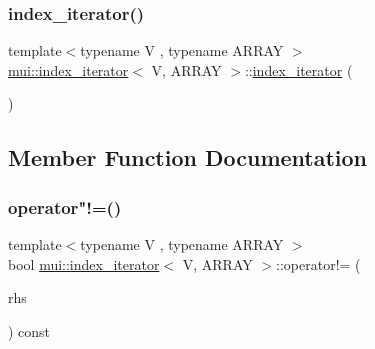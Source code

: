\mbox{\label{structmui_1_1index__iterator_ac51630f186471fbc8c55320e58b34439}} 
\subsubsection{\texorpdfstring{index\+\_\+iterator()}{index\_iterator()}\hspace{0.1cm}{\footnotesize\ttfamily [3/3]}}
{\footnotesize\ttfamily template$<$typename V , typename A\+R\+R\+AY $>$ \\
\hyperlink{structmui_1_1index__iterator}{mui\+::index\+\_\+iterator}$<$ V, A\+R\+R\+AY $>$\+::\hyperlink{structmui_1_1index__iterator}{index\+\_\+iterator} (\begin{DoxyParamCaption}\item[{const \hyperlink{structmui_1_1index__iterator}{index\+\_\+iterator}$<$ V, A\+R\+R\+AY $>$ \&}]{ }\end{DoxyParamCaption})\hspace{0.3cm}{\ttfamily [default]}}



\subsection{Member Function Documentation}
\mbox{\label{structmui_1_1index__iterator_a4d779fea0337c8d40e368c93e2c137a6}} 
\subsubsection{\texorpdfstring{operator"!=()}{operator!=()}}
{\footnotesize\ttfamily template$<$typename V , typename A\+R\+R\+AY $>$ \\
bool \hyperlink{structmui_1_1index__iterator}{mui\+::index\+\_\+iterator}$<$ V, A\+R\+R\+AY $>$\+::operator!= (\begin{DoxyParamCaption}\item[{const \hyperlink{structmui_1_1index__iterator}{index\+\_\+iterator}$<$ V, A\+R\+R\+AY $>$ \&}]{rhs }\end{DoxyParamCaption}) const\hspace{0.3cm}{\ttfamily [inline]}}

